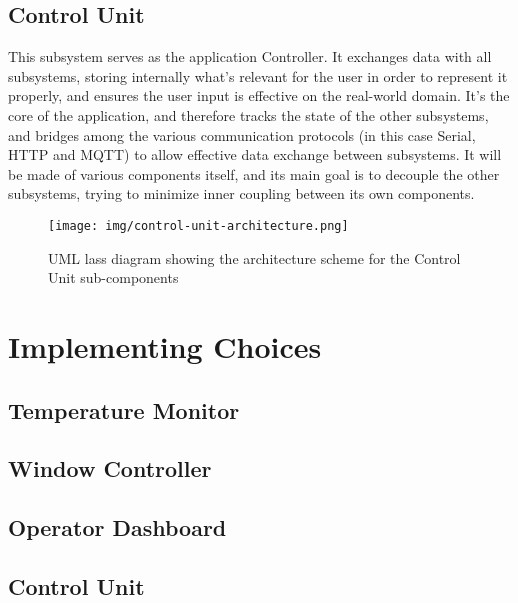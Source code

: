 \documentclass[a4paper,12pt]{report}
\begin{document}
	\section{Control Unit} %
	This subsystem serves as the application Controller. It exchanges data with all subsystems, storing internally what's relevant for the user in order to represent it properly, and ensures the user input is effective on the real-world domain. It's the core of the application, and therefore tracks the state of the other subsystems, and bridges among the various communication protocols (in this case Serial, HTTP and MQTT) to allow effective data exchange between subsystems. It will be made of various components itself, and its main goal is to decouple the other subsystems, trying to minimize inner coupling between its own components.
	\begin{figure}[H]
		\centering{}
		\texttt{[image: img/control-unit-architecture.png]}
		\caption{UML lass diagram showing the architecture scheme for the Control Unit sub-components}
		\label{img:control-unit-architecture}
	\end{figure}
	
	\chapter{Implementing Choices}
	\section{Temperature Monitor}
	\section{Window Controller}
	\section{Operator Dashboard}
	\section{Control Unit}
	
\end{document}
